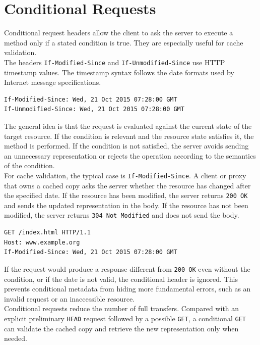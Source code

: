 \documentclass{scrbook}
\begin{document}
\section{Conditional Requests}

Conditional request headers allow the client to ask the server to execute a method only if a stated condition is true. They are especially useful for cache validation.\\

The headers \texttt{If-Modified-Since} and \texttt{If-Unmodified-Since} use HTTP timestamp values. The timestamp syntax follows the date formats used by Internet message specifications.

\begin{lstlisting}
If-Modified-Since: Wed, 21 Oct 2015 07:28:00 GMT
If-Unmodified-Since: Wed, 21 Oct 2015 07:28:00 GMT
\end{lstlisting}

The general idea is that the request is evaluated against the current state of the target resource. If the condition is relevant and the resource state satisfies it, the method is performed. If the condition is not satisfied, the server avoids sending an unnecessary representation or rejects the operation according to the semantics of the condition.\\

For cache validation, the typical case is \texttt{If-Modified-Since}. A client or proxy that owns a cached copy asks the server whether the resource has changed after the specified date. If the resource has been modified, the server returns \texttt{200 OK} and sends the updated representation in the body. If the resource has not been modified, the server returns \texttt{304 Not Modified} and does not send the body.

\begin{lstlisting}
GET /index.html HTTP/1.1
Host: www.example.org
If-Modified-Since: Wed, 21 Oct 2015 07:28:00 GMT
\end{lstlisting}

If the request would produce a response different from \texttt{200 OK} even without the condition, or if the date is not valid, the conditional header is ignored. This prevents conditional metadata from hiding more fundamental errors, such as an invalid request or an inaccessible resource.\\

Conditional requests reduce the number of full transfers. Compared with an explicit preliminary \texttt{HEAD} request followed by a possible \texttt{GET}, a conditional \texttt{GET} can validate the cached copy and retrieve the new representation only when needed.
\end{document}
